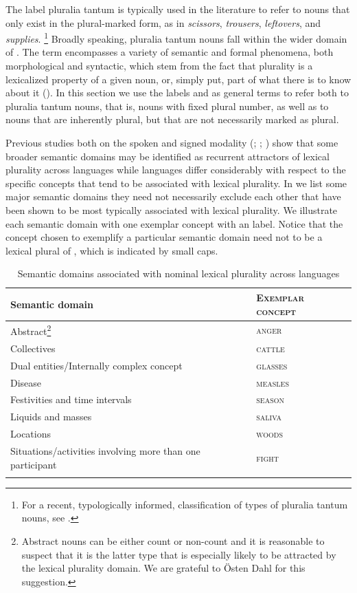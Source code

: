 \documentclass[output=collectionpaper]{langsci/langscibook}
\begin{document}
The label pluralia tantum is typically used in the literature to refer to nouns that only exist in the plural-marked form, as in  \textit{scissors}, \textit{trousers}, \textit{leftovers}, and \textit{supplies}.%
\footnote{%
For a recent, typologically informed, classification of types of pluralia tantum nouns, see \cite{Corbett2018}.
} %
Broadly speaking, pluralia tantum nouns fall within the wider domain of . The term encompasses a variety of semantic and formal phenomena, both morphological and syntactic, which stem from the fact that plurality is a lexicalized property of a given noun, or, simply put, part of what there is to know about it (\citealt[2]{Acquaviva2008}). In this section we use the labels  and  as general terms to refer both to pluralia tantum nouns, that is, nouns with fixed plural number, as well as to nouns that are inherently plural, but that are not necessarily marked as plural.

Previous studies both on the spoken and signed modality (\citealt{Koptjevskaja-Tamm2001}; \citealt{Meer2015}; \citealt{Boerstell2017}) show that some broader semantic domains may be identified as recurrent attractors of lexical plurality across languages while languages differ considerably with respect to the specific concepts that tend to be associated with lexical plurality. In  we list some major semantic domains \textendash{} they need not necessarily exclude each other \textendash{} that have been shown to be most typically associated with lexical plurality. We illustrate each semantic domain with one exemplar concept with an  label. Notice that the concept chosen to exemplify a particular semantic domain need not to be a lexical plural of , which is indicated by small caps.

\begin{table}[h]
\caption{Semantic domains associated with nominal lexical plurality across languages\label{tab:WDG:17}}
\begin{tabularx}{\textwidth}{Q>{\scshape}l}
\lsptoprule
Semantic domain 	& \normalfont	Exemplar concept\\
\midrule
Abstract\footnote{Abstract nouns can be either count or non-count and it is reasonable to suspect that it is the latter type that is especially likely to be attracted by the lexical plurality domain. We are grateful to Östen Dahl for this suggestion.}	&	anger\\
Collectives 	&	cattle\\
Dual entities/Internally complex concept 	&	glasses \\
Disease 	&	measles\\
Festivities and time intervals 	&	season\\
Liquids and masses 	&	saliva\\
Locations 	&	woods\\
Situations/activities involving more than one participant 	&	fight\\
\lspbottomrule
\end{tabularx}
\end{table}
\end{document}
